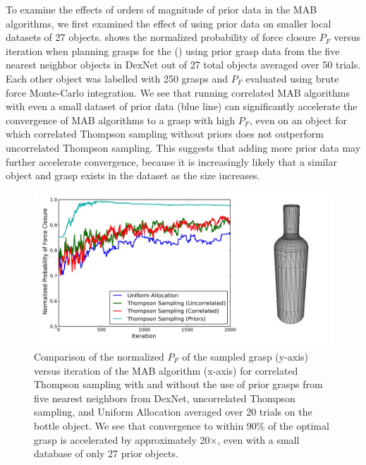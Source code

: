 To examine the effects of orders of magnitude of prior data in the MAB algorithms, we first examined the effect of using prior data on smaller local datasets of 27 objects.
 shows the normalized probability of force closure $P_F$ versus iteration when planning grasps for the () using prior grasp data from the five nearest neighbor objects in DexNet out of 27 total objects averaged over 50 trials.
Each other object was labelled with 250 grasps and $P_F$ evaluated using brute force Monte-Carlo integration.
We see that running correlated MAB algorithms with even a small dataset of prior data (blue line) can significantly accelerate the convergence of MAB algorithms to a grasp with high $P_F$, even on an object for which correlated Thompson sampling without priors does not outperform uncorrelated Thompson sampling.
This suggests that adding more prior data may further accelerate convergence, because it is increasingly likely that a similar object and grasp exists in the dataset as the size increases.

\begin{figure}[t!]
\centering
\includegraphics[scale=0.09]{figures/bottle_avg_reward_w_model.jpg}
\caption{Comparison of the normalized $P_F$ of the sampled grasp (y-axis) versus iteration of the MAB algorithm (x-axis) for correlated Thompson sampling with and without the use of prior grasps from five nearest neighbors from DexNet, uncorrelated Thompson sampling, and Uniform Allocation averaged over 20 trials on the bottle object. We see that convergence to within 90\% of the optimal grasp is accelerated by approximately 20$\times$, even with a small database of only 27 prior objects. }
\vspace*{-15pt}
\end{figure}

